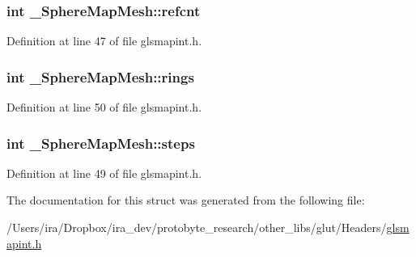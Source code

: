 \hypertarget{struct___sphere_map_mesh_a0c1c34900669d68aaf706a9e17fdeba8}{
\subsubsection[{refcnt}]{\setlength{\rightskip}{0pt plus 5cm}int \-\_\-\-Sphere\-Map\-Mesh\-::refcnt}}\label{struct___sphere_map_mesh_a0c1c34900669d68aaf706a9e17fdeba8}


Definition at line 47 of file glsmapint.\-h.

\hypertarget{struct___sphere_map_mesh_a4fee7062c54b6850d7400a1a2bd037dc}{
\subsubsection[{rings}]{\setlength{\rightskip}{0pt plus 5cm}int \-\_\-\-Sphere\-Map\-Mesh\-::rings}}\label{struct___sphere_map_mesh_a4fee7062c54b6850d7400a1a2bd037dc}


Definition at line 50 of file glsmapint.\-h.

\hypertarget{struct___sphere_map_mesh_aa2fec57e05a2fc00223c07992406fe7b}{
\subsubsection[{steps}]{\setlength{\rightskip}{0pt plus 5cm}int \-\_\-\-Sphere\-Map\-Mesh\-::steps}}\label{struct___sphere_map_mesh_aa2fec57e05a2fc00223c07992406fe7b}


Definition at line 49 of file glsmapint.\-h.



The documentation for this struct was generated from the following file\-:\begin{DoxyCompactItemize}
\item 
/\-Users/ira/\-Dropbox/ira\-\_\-dev/protobyte\-\_\-research/other\-\_\-libs/glut/\-Headers/\hyperlink{glsmapint_8h}{glsmapint.\-h}\end{DoxyCompactItemize}
